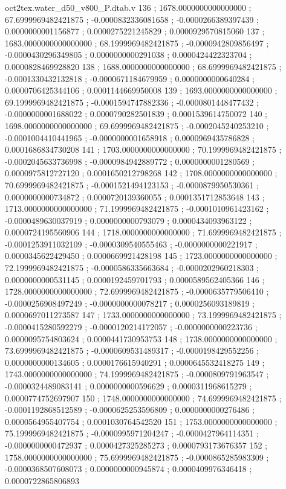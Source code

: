 \begin{filecontents}[overwrite]{oct2tex.water_d50_v800_P.dtab.v}
136 ; 1678.0000000000000000 ; 67.6999969482421875 ; -0.0000832336081658 ; -0.0000266389397439 ; 0.0000000001156877 ; 0.0000275221245829 ; 0.0000929570815060
137 ; 1683.0000000000000000 ; 68.1999969482421875 ; -0.0000942809856497 ; -0.0000430296349805 ; 0.0000000000291038 ; 0.0000424422323704 ; 0.0000828469928820
138 ; 1688.0000000000000000 ; 68.6999969482421875 ; -0.0001330432132818 ; -0.0000671184679959 ; 0.0000000000640284 ; 0.0000706425344106 ; 0.0001144669950008
139 ; 1693.0000000000000000 ; 69.1999969482421875 ; -0.0001594747882336 ; -0.0000801448477432 ; -0.0000000001688022 ; 0.0000790282501839 ; 0.0001539614750072
140 ; 1698.0000000000000000 ; 69.6999969482421875 ; -0.0002045240253210 ; -0.0001004410441965 ; -0.0000000001658918 ; 0.0000969435786828 ; 0.0001686834730208
141 ; 1703.0000000000000000 ; 70.1999969482421875 ; -0.0002045633736998 ; -0.0000984942889772 ; 0.0000000001280569 ; 0.0000975812727120 ; 0.0001650212798268
142 ; 1708.0000000000000000 ; 70.6999969482421875 ; -0.0001521494123153 ; -0.0000879950530361 ; 0.0000000000734872 ; 0.0000720139360055 ; 0.0001351712853648
143 ; 1713.0000000000000000 ; 71.1999969482421875 ; -0.0001010961423162 ; -0.0000489630037919 ; 0.0000000000793079 ; 0.0000434093963122 ; 0.0000724195560906
144 ; 1718.0000000000000000 ; 71.6999969482421875 ; -0.0001253911032109 ; -0.0000309540555463 ; -0.0000000000221917 ; 0.0000345622429450 ; 0.0000669921428198
145 ; 1723.0000000000000000 ; 72.1999969482421875 ; -0.0000586335663684 ; -0.0000202960218303 ; 0.0000000000531145 ; 0.0000192459701793 ; 0.0000589562405366
146 ; 1728.0000000000000000 ; 72.6999969482421875 ; -0.0000635779506410 ; -0.0000256908497249 ; -0.0000000000078217 ; 0.0000256093189819 ; 0.0000697011273587
147 ; 1733.0000000000000000 ; 73.1999969482421875 ; -0.0000415280592279 ; -0.0000120214172057 ; -0.0000000000223736 ; 0.0000095754803624 ; 0.0000441730953753
148 ; 1738.0000000000000000 ; 73.6999969482421875 ; -0.0000609531489317 ; -0.0000198429552256 ; 0.0000000000134605 ; 0.0000176615940291 ; 0.0000645532418275
149 ; 1743.0000000000000000 ; 74.1999969482421875 ; -0.0000809791963547 ; -0.0000324489083141 ; 0.0000000000596629 ; 0.0000311968615279 ; 0.0000774752697907
150 ; 1748.0000000000000000 ; 74.6999969482421875 ; -0.0001192868512589 ; -0.0000625253596809 ; 0.0000000000276486 ; 0.0000564955407754 ; 0.0001030764542520
151 ; 1753.0000000000000000 ; 75.1999969482421875 ; -0.0000995971204247 ; -0.0000427964114351 ; -0.0000000000472937 ; 0.0000427325285273 ; 0.0000793173676357
152 ; 1758.0000000000000000 ; 75.6999969482421875 ; -0.0000865285983309 ; -0.0000368507608073 ; 0.0000000000945874 ; 0.0000409976346418 ; 0.0000722865806893

\end{filecontents}
